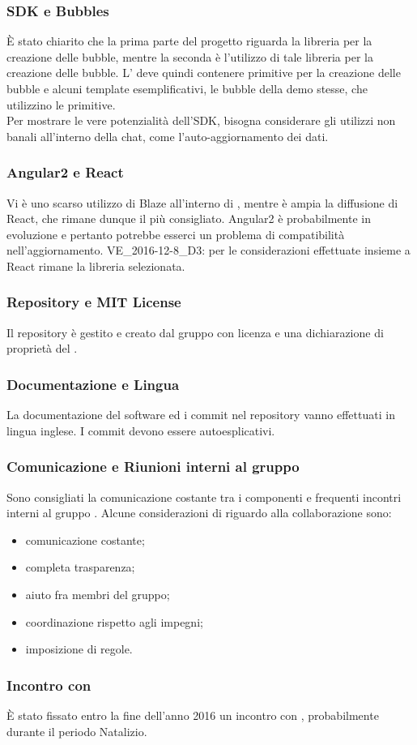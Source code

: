 \subsubsection{SDK e Bubbles}
È stato chiarito che la prima parte del progetto riguarda la libreria per la creazione delle bubble, mentre la seconda è l'utilizzo di tale libreria per la creazione delle bubble. L' deve quindi contenere primitive per la creazione delle bubble e alcuni template esemplificativi, le bubble della demo stesse, che utilizzino le primitive.\\
Per mostrare le vere potenzialità dell'SDK, bisogna considerare gli utilizzi non banali all'interno della chat, come l'auto-aggiornamento dei dati.

\subsubsection{Angular2 e React}
Vi è uno scarso utilizzo di Blaze all'interno di , mentre è ampia la diffusione di React, che rimane dunque il più consigliato. Angular2 è probabilmente in evoluzione e pertanto potrebbe esserci un problema di compatibilità nell'aggiornamento.
VE\_2016-12-8\_D3: per le considerazioni effettuate insieme a \Proponente React rimane la libreria selezionata.

\subsubsection{Repository e MIT License}
Il repository è gestito e creato dal gruppo \GroupName{} con licenza  e una dichiarazione di proprietà del \Proponente{}.

\subsubsection{Documentazione e Lingua}
La documentazione del software ed i commit nel repository vanno effettuati in lingua inglese. I commit devono essere autoesplicativi.

\subsubsection{Comunicazione e Riunioni interni al gruppo \GroupName{}}
Sono consigliati la comunicazione costante tra i componenti e frequenti incontri interni al gruppo \GroupName{}. Alcune considerazioni di \Proponente{} riguardo alla collaborazione sono: 
\begin{itemize}
	\item comunicazione costante;
	\item completa trasparenza;
	\item aiuto fra membri del gruppo;
	\item coordinazione rispetto agli impegni;
	\item imposizione di regole.
\end{itemize}

\subsubsection{Incontro con \Proponente}
È stato fissato entro la fine dell'anno 2016 un incontro con \Proponente{}, probabilmente durante il periodo Natalizio.

\clearpage
